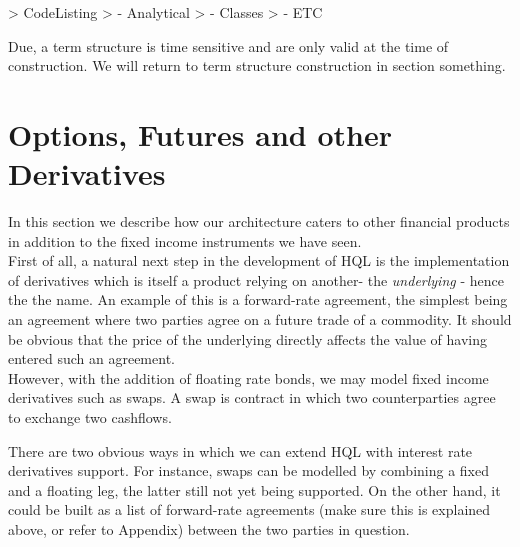 > CodeListing
> 	- Analytical
>	- Classes
>	- ETC

Due, a term structure is time sensitive and are only valid at the time of 
construction. We will return to term structure construction in section 
something.

\section{Options, Futures and other Derivatives}

In this section we describe how our architecture caters to other financial 
products in addition to the fixed income instruments we have seen.\\

First of all, a natural next step in the development of HQL is the 
implementation of derivatives which is itself a product relying on another- the 
\emph{underlying} - hence the the name. An example of this is 
a forward-rate agreement, the simplest being an agreement where two parties 
agree on a future trade of a commodity. It should be obvious that the price of 
the underlying directly affects the value of having entered such an agreement.\\

However, with the addition of floating rate bonds, we may model fixed income 
derivatives such as swaps. A swap is contract in which two counterparties agree 
to exchange two cashflows.


There are two obvious ways in which we can extend HQL with interest rate 
derivatives support. For instance, swaps can be modelled by combining a fixed 
and a floating leg, the latter still not yet being supported. On the other 
hand, it could be built as a list of forward-rate agreements (make sure this is 
explained above, or refer to Appendix) between the two parties in question.
